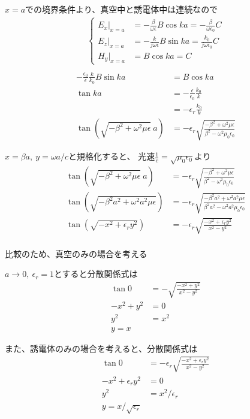 \documentclass[a4paper,10pt]{bxjsarticle}
\begin{document}
$x=a$での境界条件より、真空中と誘電体中は連続なので
\begin{align*}
    \begin{cases}
        E_x |_{x=a} &= -\frac{\beta}{\omega \epsilon} B \cos ka = -\frac{\beta}{\omega \epsilon_0} C \\
        E_z |_{x=a} &= -\frac{k}{j\omega \epsilon} B \sin ka = \frac{k_0}{j\omega \epsilon_0}C \\
        H_y |_{x=a} &= B \cos ka = C 
    \end{cases} \\
\end{align*}
\begin{align*}
    -\frac{\epsilon_0}{\epsilon} \frac{k}{k_0} B \sin ka &= B \cos ka \\
    \tan ka &= - \frac{\epsilon}{\epsilon_0} \frac{k_0}{k}\\
            &= - \epsilon_r \frac{k_0}{k} \\
    \tan (\sqrt{-\beta^2+\omega^2 \mu \epsilon}\ a) &= - \epsilon_r \sqrt{\frac{-\beta^2+\omega^2 \mu \epsilon}{\beta^2-\omega^2 \mu_0 \epsilon_0}}
\end{align*}

$x = \beta a,\ y = \omega a /c$と規格化すると、
光速$\frac{1}{c} = \sqrt{\mu_0 \epsilon_0} $より
\begin{align*}
    \tan (\sqrt{-\beta^2+\omega^2 \mu \epsilon}\ a) &= - \epsilon_r \sqrt{\frac{-\beta^2+\omega^2 \mu \epsilon}{\beta^2-\omega^2 \mu_0 \epsilon_0}} \\
    \tan (\sqrt{-\beta^2 a^2+\omega^2 a^2 \mu \epsilon} ) &= - \epsilon_r \sqrt{\frac{-\beta^2 a^2 +\omega^2 a^2 \mu \epsilon}{\beta^2 a^2 - \omega^2 a^2 \mu_0 \epsilon_0}} \\
    \tan (\sqrt{-x^2 + \epsilon_r y^2 } ) &= - \epsilon_r \sqrt{\frac{-x^2 + \epsilon_r y^2}{ x^2 - y^2}} \\
\end{align*} 

比較のため、真空のみの場合を考える

$a \rightarrow 0,\ \epsilon_r = 1$とすると分散関係式は
\begin{align*}
    \tan 0 &= - \sqrt{\frac{-x^2 + y^2}{ x^2 - y^2}} \\
    -x^2 + y^2 &= 0 \\
    y^2 &= x^2 \\ 
    y = x
\end{align*}

また、誘電体のみの場合を考えると、分散関係式は
\begin{align*}
    \tan 0 &= - \epsilon_r \sqrt{\frac{-x^2 + \epsilon_r y^2}{ x^2 - y^2}} \\
    -x^2 + \epsilon_r y^2 &= 0 \\
    y^2 &= x^2 / \epsilon_r \\ 
    y = x / \sqrt{\epsilon_r}
\end{align*}
\end{document}
